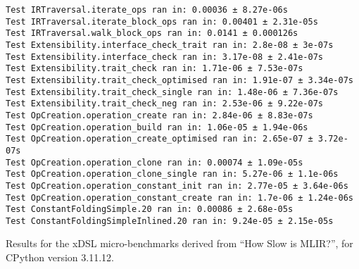 \begin{code}
    \begin{verbatim}
Test IRTraversal.iterate_ops ran in: 0.00036 ± 8.27e-06s
Test IRTraversal.iterate_block_ops ran in: 0.00401 ± 2.31e-05s
Test IRTraversal.walk_block_ops ran in: 0.0141 ± 0.000126s
Test Extensibility.interface_check_trait ran in: 2.8e-08 ± 3e-07s
Test Extensibility.interface_check ran in: 3.17e-08 ± 2.41e-07s
Test Extensibility.trait_check ran in: 1.71e-06 ± 7.53e-07s
Test Extensibility.trait_check_optimised ran in: 1.91e-07 ± 3.34e-07s
Test Extensibility.trait_check_single ran in: 1.48e-06 ± 7.36e-07s
Test Extensibility.trait_check_neg ran in: 2.53e-06 ± 9.22e-07s
Test OpCreation.operation_create ran in: 2.84e-06 ± 8.83e-07s
Test OpCreation.operation_build ran in: 1.06e-05 ± 1.94e-06s
Test OpCreation.operation_create_optimised ran in: 2.65e-07 ± 3.72e-07s
Test OpCreation.operation_clone ran in: 0.00074 ± 1.09e-05s
Test OpCreation.operation_clone_single ran in: 5.27e-06 ± 1.1e-06s
Test OpCreation.operation_constant_init ran in: 2.77e-05 ± 3.64e-06s
Test OpCreation.operation_constant_create ran in: 1.7e-06 ± 1.24e-06s
Test ConstantFoldingSimple.20 ran in: 0.00086 ± 2.68e-05s
Test ConstantFoldingSimpleInlined.20 ran in: 9.24e-05 ± 2.15e-05s
    \end{verbatim}
    \caption{Results for the xDSL micro-benchmarks derived from ``How Slow is MLIR?'', for CPython version 3.11.12.}
    \label{listing:how-slow-is-mlir-xdsl-microbenchmark-results-311}
\end{code}




